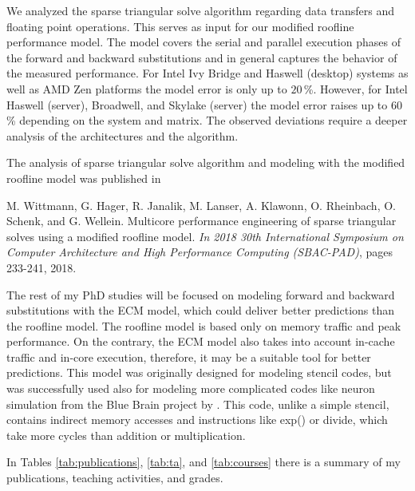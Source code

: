 
We analyzed the sparse triangular solve algorithm regarding data
transfers and floating point operations.
This serves as input for our modified roofline performance model.
The model covers the serial and parallel execution phases of the forward and
backward substitutions and in general captures the behavior of the measured
performance.
%
For Intel Ivy Bridge and Haswell (desktop) systems as well as AMD Zen platforms
the model error is only up to $20$\,\%.
However, for Intel Haswell (server), Broadwell, and Skylake (server) the model
error raises up to $60$\,\% depending on the system and matrix.
%
The observed deviations require a deeper analysis
of the architectures
and the algorithm.

The analysis of sparse triangular solve algorithm and modeling with the modified roofline model was published in %

\vspace{0.5em}
M. Wittmann, G. Hager, R. Janalik, M. Lanser, A. Klawonn, O. Rheinbach, O. Schenk, and G. Wellein. Multicore performance engineering of sparse triangular solves using a modified roofline model. \textit{In 2018 30th International Symposium on Computer Architecture and High Performance Computing (SBAC-PAD)}, pages 233-241, 2018.
\vspace{0.5em}

The rest of my PhD studies will be focused on modeling forward and backward substitutions with the ECM model, which could deliver better predictions than the roofline model.
The roofline model is based only on memory traffic and peak performance.
On the contrary, the ECM model also takes into account in-cache traffic and in-core execution, therefore, it may be a suitable tool for better predictions. This model was originally designed for modeling stencil codes, but was successfully used also for modeling more complicated codes like neuron simulation from the Blue Brain project by \cite{Cremonesi-2020}. This code, unlike a simple stencil, contains indirect memory accesses and instructions like exp() or divide, which take more cycles than addition or multiplication.

In Tables \ref{tab:publications}, \ref{tab:ta}, and \ref{tab:courses} there is a summary of my publications, teaching activities, and grades.

